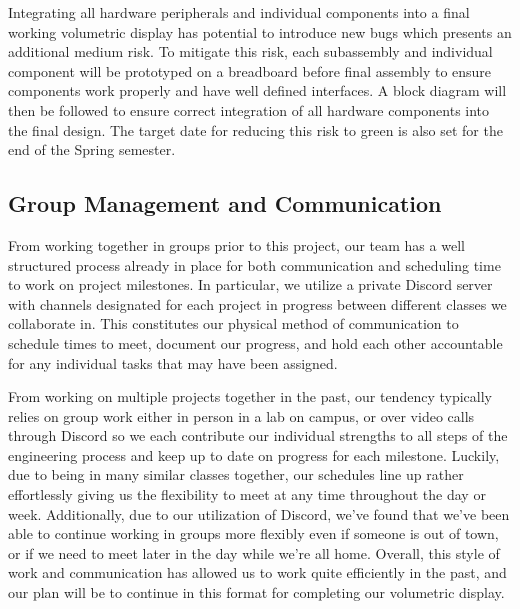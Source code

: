 \documentclass[11pt,journal]{IEEEtran}
\begin{document}
Integrating all hardware peripherals and individual components into a final working volumetric display has potential to introduce new bugs which presents an additional medium risk. To mitigate this risk, each subassembly and individual component will be prototyped on a breadboard before final assembly to ensure components work properly and have well defined interfaces. A block diagram will then be followed to ensure correct integration of all hardware components into the final design. The target date for reducing this risk to green is also set for the end of the Spring semester.

\subsection{Group Management and Communication}

From working together in groups prior to this project, our team has a well structured process already in place for both communication and scheduling time to work on project milestones. In particular, we utilize a private Discord server with channels designated for each project in progress between different classes we collaborate in. This constitutes our physical method of communication to schedule times to meet, document our progress, and hold each other accountable for any individual tasks that may have been assigned.

From working on multiple projects together in the past, our tendency typically relies on group work either in person in a lab on campus, or over video calls through Discord so we each contribute our individual strengths to all steps of the engineering process and keep up to date on progress for each milestone. Luckily, due to being in many similar classes together, our schedules line up rather effortlessly giving us the flexibility to meet at any time throughout the day or week. Additionally, due to our utilization of Discord, we’ve found that we’ve been able to continue working in groups more flexibly even if someone is out of town, or if we need to meet later in the day while we’re all home. Overall, this style of work and communication has allowed us to work quite efficiently in the past, and our plan will be to continue in this format for completing our volumetric display.
\end{document}
